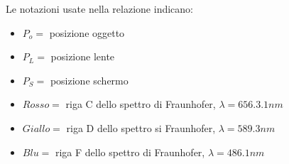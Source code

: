 Le notazioni usate nella relazione indicano:
\begin{itemize}
\item $P_o =$ posizione oggetto
\item $P_L =$ posizione lente
\item $P_S =$ posizione schermo
\item $Rosso =$ riga C dello spettro di Fraunhofer, $\lambda = 656.3.1 nm$
\item $Giallo =$ riga D dello spettro si Fraunhofer, $\lambda = 589.3 nm$
\item $Blu =$ riga F dello spettro di Fraunhofer, $\lambda = 486.1 nm$
\end{itemize}
